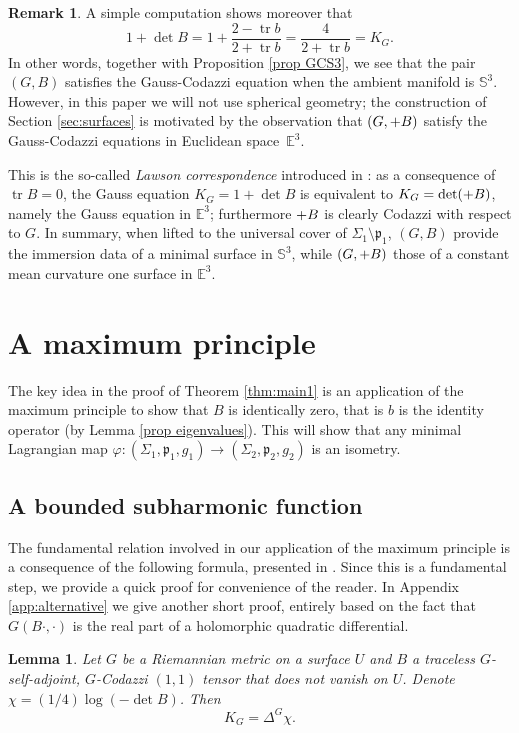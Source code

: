 \documentclass[11pt]{article}
\makeatletter
\DeclareRobustCommand{\mathbbm}[1]{\csname jepbb@#1\endcsname}
\newtheorem{lemma}[cor]{Lemma}
\theoremstyle{definition}
\newtheorem{remark}[cor]{Remark}
\newcommand{\E}{\mathbb{E}}
\DeclareMathOperator{\tr}{tr}
\makeatother
\begin{document}
\begin{remark} \label{rmk lawson}
A simple computation shows moreover that
\[
1+\det B=1+\frac{2-\tr b}{2+\tr b}=\frac{4}{2+\tr b}=K_G.
\]
In other words, together with Proposition \ref{prop GCS3}, we see that the pair $(G,B)$ satisfies the Gauss-Codazzi equation when the ambient manifold is $\mathbb S^3$. However, in this paper we will not use spherical geometry; the construction of Section \ref{sec:surfaces} is motivated by the observation that $(G,\mathbbm 1+B)$ satisfy the Gauss-Codazzi equations in Euclidean space~$\E^3$.

This is the so-called \emph{Lawson correspondence} introduced in \cite{zbMATH03327055}: as a consequence of $\tr  B=0$, the Gauss equation $K_G=1+\det B$ is equivalent to $K_G=\det(\mathbbm 1+B)$, namely the Gauss equation in $\E^3$; furthermore $\mathbbm 1+B$ is clearly Codazzi with respect to $G$. In summary, when lifted to the universal cover of $\Sigma_1\setminus\mathfrak p_1$, $(G,B)$ provide the immersion data of a minimal surface in $\mathbb S^3$, while $(G,\mathbbm 1+B)$ those of a constant mean curvature one surface in $\mathbb E^3$.
\end{remark}

\section{A maximum principle}

The key idea in the proof of Theorem \ref{thm:main1} is an application of the maximum principle to show that $B$ is identically zero, that is $b$ is the identity operator (by Lemma \ref{prop eigenvalues}). This will show that any minimal Lagrangian map $\varphi:(\Sigma_1,\mathfrak p_1,g_1)\to (\Sigma_2,\mathfrak p_2,g_2)$ is an isometry.

\subsection{A bounded subharmonic function}

The fundamental relation involved in our application of the maximum principle is a consequence of the following formula, presented in \cite[Lem.\,3.11]{zbMATH05200423}. Since this is a fundamental step, we provide a quick proof for convenience of the reader. In Appendix \ref{app:alternative} we give another short proof, entirely based on the fact that $G(B\cdot,\cdot)$ is the real part of a holomorphic quadratic differential.

\begin{lemma}\label{lemma laplace}
Let $G$ be a Riemannian metric on a surface $U$ and $B$ a traceless $G$-self-adjoint, $G$-Codazzi $(1,1)$ tensor that does not vanish on $U$. Denote $\chi=(1/4)\log(-\det B)$. Then
\[
K_G=\Delta^G\chi.
\]
\end{lemma}
\end{document}
